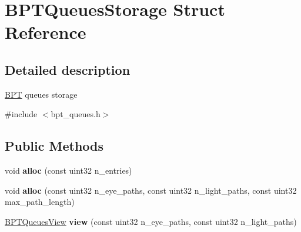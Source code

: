 \hypertarget{struct_b_p_t_queues_storage}{}\section{B\+P\+T\+Queues\+Storage Struct Reference}
\label{struct_b_p_t_queues_storage}


\subsection{Detailed description}
\hyperlink{struct_b_p_t}{B\+PT} queues storage 

{\ttfamily \#include $<$bpt\+\_\+queues.\+h$>$}

\subsection*{Public Methods}
\begin{DoxyCompactItemize}
\item 
\mbox{\label{struct_b_p_t_queues_storage_a6cf3cb625ed3dc5529dcc1e294c6c6f0}} 
void {\bfseries alloc} (const uint32 n\+\_\+entries)
\item 
\mbox{\label{struct_b_p_t_queues_storage_a9d381ccb349b7b703f8ec38d746cf27b}} 
void {\bfseries alloc} (const uint32 n\+\_\+eye\+\_\+paths, const uint32 n\+\_\+light\+\_\+paths, const uint32 max\+\_\+path\+\_\+length)
\item 
\mbox{\label{struct_b_p_t_queues_storage_a2f22b8ebded7c050ecbf218a855c0e80}} 
\hyperlink{struct_b_p_t_queues_view}{B\+P\+T\+Queues\+View} {\bfseries view} (const uint32 n\+\_\+eye\+\_\+paths, const uint32 n\+\_\+light\+\_\+paths)
\end{DoxyCompactItemize}
